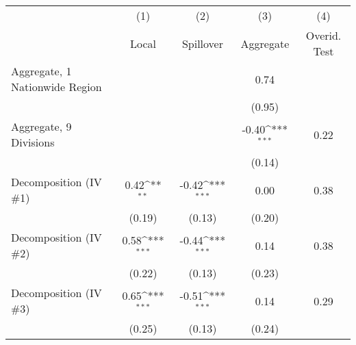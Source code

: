 \def\sym#1{\ifmmode^{#1}\else\(^{#1}\)\fi}          \begin{tabular}{l*{4}{c}}          \hline
  & (1) & (2) & (3)  & (4) \\ & Local & Spillover & Aggregate  & Overid. Test \\ \hline
Aggregate, 1 Nationwide Region&                     &                     &        0.74         &            \\
            &                     &                     &      (0.95)         &            \\
Aggregate, 9 Divisions&                     &                     &       -0.40\sym{***}&        0.22\\
            &                     &                     &      (0.14)         &            \\
Decomposition (IV \#1)&        0.42\sym{**} &       -0.42\sym{***}&        0.00         &        0.38\\
            &      (0.19)         &      (0.13)         &      (0.20)         &            \\
Decomposition (IV \#2)&        0.58\sym{***}&       -0.44\sym{***}&        0.14         &        0.38\\
            &      (0.22)         &      (0.13)         &      (0.23)         &            \\
Decomposition (IV \#3)&        0.65\sym{***}&       -0.51\sym{***}&        0.14         &        0.29\\
            &      (0.25)         &      (0.13)         &      (0.24)         &            \\
\hline          \end{tabular}
